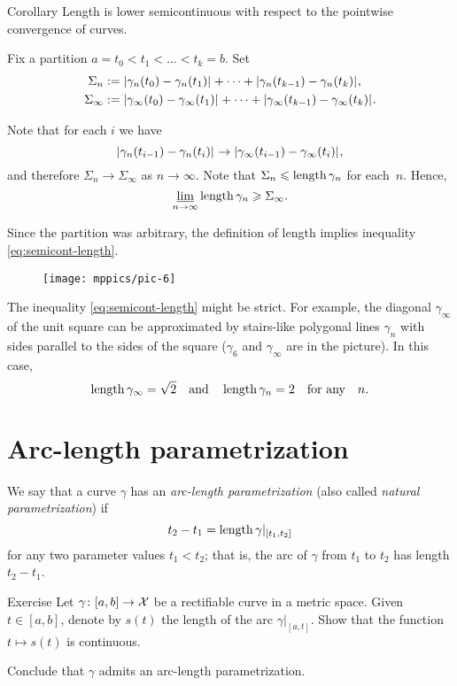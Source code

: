 \begin{thm}{Corollary}\label{thm:length-semicont}
Length is lower semicontinuous with respect to the pointwise convergence of curves. 
\end{thm}

Fix a partition $a=t_0<t_1<\dots<t_k=b$.
Set 
\begin{align*}\Sigma_n
&\df
\dist{\gamma_n(t_0)}{\gamma_n(t_1)}{}
+\dots+
\dist{\gamma_n(t_{k-1})}{\gamma_n(t_k)}{},
\\
\Sigma_\infty
&\df
\dist{\gamma_\infty(t_0)}{\gamma_\infty(t_1)}{}
+\dots+
\dist{\gamma_\infty(t_{k-1})}{\gamma_\infty(t_k)}{}.
\end{align*}

Note that for each $i$ we have 
\[\dist{\gamma_n(t_{i-1})}{\gamma_n(t_i)}{}
\to
\dist{\gamma_\infty(t_{i-1})}{\gamma_\infty(t_i)}{},\]
and therefore
$\Sigma_n\to \Sigma_\infty$
as $n\to\infty$.
Note that 
$\Sigma_n\leqslant\mathop{\rm length}\nolimits\gamma_n$
for each~$n$.
Hence,
$$\varliminf_{n\to\infty} \mathop{\rm length}\nolimits\gamma_n \geqslant \Sigma_\infty.$$

  
Since the partition was arbitrary, the definition of length implies inequality \ref{eq:semicont-length}.
\qeds


\begin{wrapfigure}{o}{20 mm}
\vskip3mm
\centering
\texttt{[image: mppics/pic-6]}
\end{wrapfigure}


The inequality \ref{eq:semicont-length} might be strict.
For example, the diagonal $\gamma_\infty$ of the unit square 
can be approximated by stairs-like polygonal lines $\gamma_n$
with sides parallel to the sides of the square ($\gamma_6$ and $\gamma_\infty$ are in the picture).
In this case,
\[\mathop{\rm length}\nolimits\gamma_\infty=\sqrt{2}
\quad
\text{and}\quad
\mathop{\rm length}\nolimits\gamma_n=2
\quad
\text{for any}\quad
n.\]

  
\section{Arc-length parametrization}

We say that a curve $\gamma$ has an \emph{arc-length parametrization} (also called \emph{natural parametrization})
if 
\[t_2-t_1=\mathop{\rm length}\nolimits \gamma|_{[t_1,t_2]}\]
for any two parameter values $t_1<t_2$;
that is, the arc of $\gamma$ from $t_1$ to $t_2$ has length $t_2-t_1$.

\begin{thm}{Exercise}\label{ex:cont-length}
Let  $\gamma\colon[a,b]\to \mathcal{X}$ be a rectifiable curve in a metric space.
Given $t\in [a,b]$, denote by $s(t)$ the length of the arc $\gamma|_{[a,t]}$.
Show that the function $t\mapsto s(t)$ is continuous.

Conclude that $\gamma$ admits an arc-length parametrization.
\end{thm}

